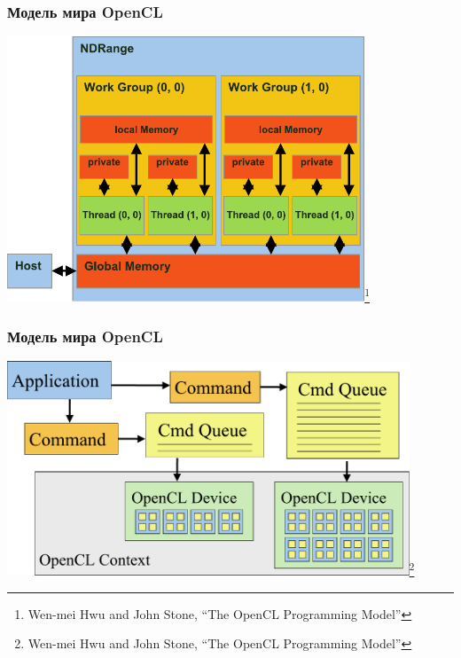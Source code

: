 \documentclass[xcolor=table]{beamer}
\begin{document}
\begin{frame}[fragile]
  \transwipe[direction=90]
  \frametitle{Модель мира OpenCL}
    \begin{center}
      \includegraphics[width=0.8\textwidth]{pictures/Model1.pdf}\footnote{\small{Wen-mei Hwu and John Stone, ``The OpenCL Programming Model''}}
    \end{center} 
\end{frame}


\begin{frame}[fragile]
  \transwipe[direction=90]
  \frametitle{Модель мира OpenCL}
    \begin{center}
      \includegraphics[width=0.9\textwidth]{pictures/Model2.pdf}\footnote{\small{Wen-mei Hwu and John Stone, ``The OpenCL Programming Model''}}
    \end{center} 
\end{frame}
\end{document}
